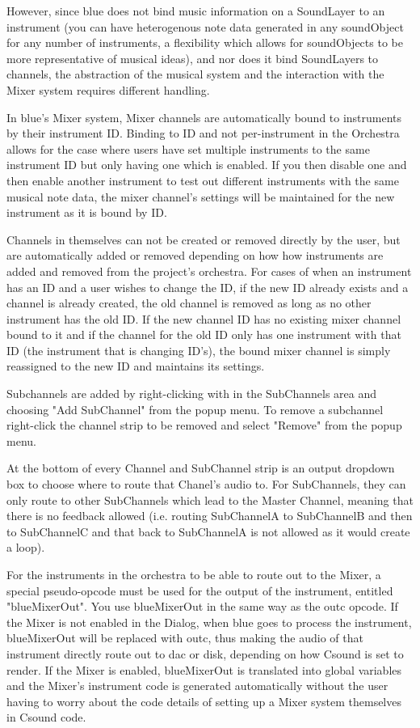 However, since blue does not bind music information on a SoundLayer to
an instrument (you can have heterogenous note data generated in any
soundObject for any number of instruments, a flexibility which allows
for soundObjects to be more representative of musical ideas), and nor
does it bind SoundLayers to channels, the abstraction of the musical
system and the interaction with the Mixer system requires different
handling.

In blue's Mixer system, Mixer channels are automatically bound to
instruments by their instrument ID. Binding to ID and not per-instrument
in the Orchestra allows for the case where users have set multiple
instruments to the same instrument ID but only having one which is
enabled. If you then disable one and then enable another instrument to
test out different instruments with the same musical note data, the
mixer channel's settings will be maintained for the new instrument as it
is bound by ID.

Channels in themselves can not be created or removed directly by the
user, but are automatically added or removed depending on how how
instruments are added and removed from the project's orchestra. For
cases of when an instrument has an ID and a user wishes to change the
ID, if the new ID already exists and a channel is already created, the
old channel is removed as long as no other instrument has the old ID. If
the new channel ID has no existing mixer channel bound to it and if the
channel for the old ID only has one instrument with that ID (the
instrument that is changing ID's), the bound mixer channel is simply
reassigned to the new ID and maintains its settings.

Subchannels are added by right-clicking with in the SubChannels area and
choosing "Add SubChannel" from the popup menu. To remove a subchannel
right-click the channel strip to be removed and select "Remove" from the
popup menu.

At the bottom of every Channel and SubChannel strip is an output
dropdown box to choose where to route that Chanel's audio to. For
SubChannels, they can only route to other SubChannels which lead to the
Master Channel, meaning that there is no feedback allowed (i.e. routing
SubChannelA to SubChannelB and then to SubChannelC and that back to
SubChannelA is not allowed as it would create a loop).

For the instruments in the orchestra to be able to route out to the
Mixer, a special pseudo-opcode must be used for the output of the
instrument, entitled "blueMixerOut". You use blueMixerOut in the same
way as the outc opcode. If the Mixer is not enabled in the Dialog, when
blue goes to process the instrument, blueMixerOut will be replaced with
outc, thus making the audio of that instrument directly route out to dac
or disk, depending on how Csound is set to render. If the Mixer is
enabled, blueMixerOut is translated into global variables and the
Mixer's instrument code is generated automatically without the user
having to worry about the code details of setting up a Mixer system
themselves in Csound code.

